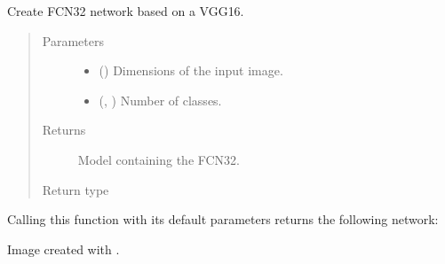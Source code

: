 \documentclass[letterpaper,10pt,english]{sphinxmanual}
\begin{document}
\begin{fulllineitems}
\label{\detokenize{models/fcn:models.fcn_vgg.FCN32_VGG16}}
Create FCN32 network based on a VGG16.
\begin{quote}\begin{description}
\item[{Parameters}] \leavevmode\begin{itemize}
\item {} 
 () \textendash{} Dimensions of the input image.

\item {} 
 (, ) \textendash{} Number of classes.

\end{itemize}

\item[{Returns}] \leavevmode
{} \textendash{} Model containing the FCN32.

\item[{Return type}] \leavevmode
{}

\end{description}\end{quote}

Calling this function with its default parameters returns the following network:


Image created with .

\end{fulllineitems}

\end{document}
